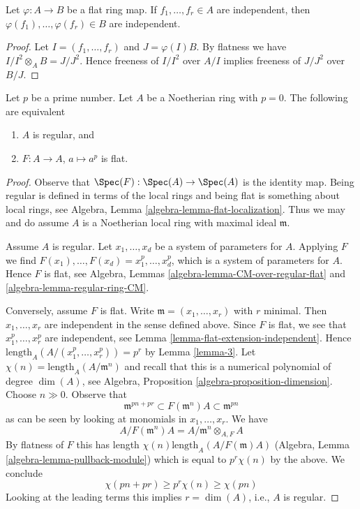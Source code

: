 \begin{lemma}
\label{lemma-flat-extension-independent}
Let $\varphi : A \to B$ be a flat ring map.
If $f_1, \ldots, f_r \in A$ are independent, then
$\varphi(f_1), \ldots, \varphi(f_r) \in B$ are independent.
\end{lemma}

\begin{proof}
Let $I = (f_1, \ldots, f_r)$ and $J = \varphi(I)B$. By flatness we have
$I/I^2 \otimes_A B = J/J^2$. Hence freeness of $I/I^2$ over $A/I$
implies freeness of $J/J^2$ over $B/J$.
\end{proof}

\begin{lemma}[Kunz]
\label{lemma-frobenius-flat-regular}
\begin{reference}
\cite{Kunz-flat}
\end{reference}
Let $p$ be a prime number.
Let $A$ be a Noetherian ring with $p = 0$.
The following are equivalent
\begin{enumerate}
\item $A$ is regular, and
\item $F : A \to A$, $a \mapsto a^p$ is flat.
\end{enumerate}
\end{lemma}

\begin{proof}
Observe that $\Spec(F) : \Spec(A) \to \Spec(A)$ is the identity map.
Being regular is defined in terms of the local rings and being flat
is something about local rings, see
Algebra, Lemma \ref{algebra-lemma-flat-localization}.
Thus we may and do assume $A$ is a Noetherian
local ring with maximal ideal $\mathfrak m$.

\medskip\noindent
Assume $A$ is regular. Let $x_1, \ldots, x_d$ be a
system of parameters for $A$. Applying $F$ we find
$F(x_1), \ldots, F(x_d) = x_1^p, \ldots, x_d^p$,
which is a system of parameters for $A$. Hence $F$ is flat, see
Algebra, Lemmas \ref{algebra-lemma-CM-over-regular-flat} and
\ref{algebra-lemma-regular-ring-CM}.

\medskip\noindent
Conversely, assume $F$ is flat. Write $\mathfrak m = (x_1, \ldots, x_r)$
with $r$ minimal. Then $x_1, \ldots, x_r$ are independent in the sense
defined above. Since $F$ is flat, we see that $x_1^p, \ldots, x_r^p$
are independent, see Lemma \ref{lemma-flat-extension-independent}.
Hence $\text{length}_A(A/(x_1^p, \ldots, x_r^p)) = p^r$ by
Lemma \ref{lemma-3}.
Let $\chi(n) = \text{length}_A(A/\mathfrak m^n)$ and recall
that this is a numerical polynomial of degree $\dim(A)$, see
Algebra, Proposition \ref{algebra-proposition-dimension}.
Choose $n \gg 0$. Observe that
$$
\mathfrak m^{pn + pr} \subset F(\mathfrak m^n)A \subset \mathfrak m^{pn}
$$
as can be seen by looking at monomials in $x_1, \ldots, x_r$. We have
$$
A/F(\mathfrak m^n)A = A/\mathfrak m^n \otimes_{A, F} A
$$
By flatness of $F$ this has length $\chi(n) \text{length}_A(A/F(\mathfrak m)A)$
(Algebra, Lemma \ref{algebra-lemma-pullback-module})
which is equal to $p^r\chi(n)$ by the above. We conclude
$$
\chi(pn + pr) \geq p^r\chi(n) \geq \chi(pn)
$$
Looking at the leading terms this implies $r = \dim(A)$, i.e., $A$ is regular.
\end{proof}




